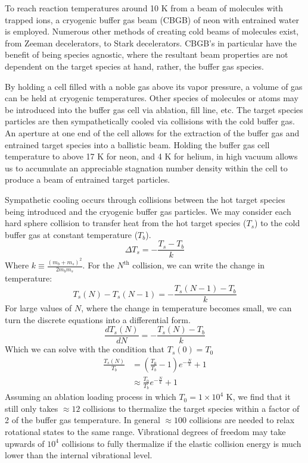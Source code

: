 To reach reaction temperatures around 10 K from a beam of molecules with trapped ions, a cryogenic buffer gas beam (CBGB) of neon with entrained water is employed. Numerous other methods of creating cold beams of molecules exist, from Zeeman decelerators, to Stark decelerators.\cite{Narevicius2008,Hudson2006} CBGB's in particular have the benefit of being species agnostic, where the resultant beam properties are not dependent on the target species at hand, rather, the buffer gas species.\cite{}

By holding a cell filled with a noble gas above its vapor pressure, a volume of gas can be held at cryogenic temperatures. Other species of molecules or atoms may be introduced into the buffer gas cell via ablation, fill line, etc. The target species particles are then sympathetically cooled via collisions with the cold buffer gas. An aperture at one end of the cell allows for the extraction of the buffer gas and entrained target species into a ballistic beam. Holding the buffer gas cell temperature to above 17 K for neon, and 4 K for helium, in high vacuum allows us to accumulate an appreciable stagnation number density within the cell to produce a beam of entrained target particles.

Sympathetic cooling occurs through collisions between the hot target species being introduced and the cryogenic buffer gas particles. We may consider each hard sphere collision to transfer heat from the hot target species ($T_s$) to the cold buffer gas at constant temperature ($T_b$).
\begin{equation*}
	\Delta T_s = -\frac{T_s - T_b}{k}
\end{equation*}
Where $k \equiv \frac{(m_b + m_s)^2}{2 m_b m_s}$. For the $N^{\text{th}}$ collision, we can write the change in temperature:
\begin{equation*}
	T_s(N) - T_s(N-1) = -\frac{T_s(N-1)-T_b}{k}
\end{equation*}
For large values of $N$, where the change in temperature becomes small, we can turn the discrete equations into a differential form.
\begin{equation*}
	\frac{d T_s(N)}{dN} = -\frac{T_s(N) - T_b}{k}
\end{equation*}
Which we can solve with the condition that $T_s(0)=T_0$
\begin{align*}
	\frac{T_s(N)}{T_b} & = \left(\frac{T_0}{T_b} - 1\right)e^{-\frac{N}{k}} +1 \\
	& \approx \frac{T_0}{T_b}e^{-\frac{N}{k}} + 1
\end{align*}
Assuming an ablation loading process in which $T_0=1 \times 10^4$ K, we find that it still only takes $\approx 12$ collisions to thermalize the target species within a factor of 2 of the buffer gas temperature. In general $\approx 100$ collisions are needed to relax rotational states to the same range. Vibrational degrees of freedom may take upwards of $10^4$ collisions to fully thermalize if the elastic collision energy is much lower than the internal vibrational level.


